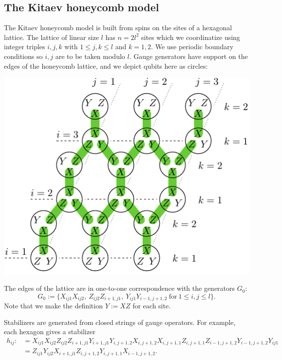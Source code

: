 \subsection{The Kitaev honeycomb model}




The Kitaev honeycomb model \cite{Kitaev2006} is built from spins on
the sites of a hexagonal lattice. 
The lattice of linear size $l$ has $n=2l^2$ sites
which we coordinatize using integer triples $i, j, k$
with $1\le j, k\le l$ and $k=1, 2.$
We use periodic boundary conditions so $i, j$ are
to be taken modulo $l$.
Gauge generators have support on the edges of the honeycomb lattice,
and we depict qubits here as circles:
\begin{center}
\includegraphics[width=0.6\columnwidth]{fig_00.pdf}
\end{center}
The edges of the lattice are in one-to-one
correspondence with the generators $G_0$:
$$
G_0 := \big\{X_{ij1}X_{ij2},\ Z_{ij2}Z_{i+1,j1},\ Y_{ij1}Y_{i-1,j+1,2}
\ \mbox{for}\ 1\le i,j\le l\big\}.
$$
Note that we make the definition $Y:=XZ$ for each site.

Stabilizers are generated from closed strings of
gauge operators. 
For example, each hexagon gives a stabilizer
\begin{align*}
h_{ij}:&= 
X_{ij1}X_{ij2}
Z_{ij2}Z_{i+1,j1}
Y_{i+1,j1}Y_{i,j+1,2}
X_{i,j+1,2}X_{i,j+1,1}
Z_{i,j+1,1}Z_{i-1,j+1,2}
Y_{i-1,j+1,2}Y_{ij1}
\\
&= 
Z_{ij1} Y_{ij2} X_{i+1,j1}
Z_{i,j+1,2} Y_{i,j+1,1} X_{i-1,j+1,2}.
\end{align*}

